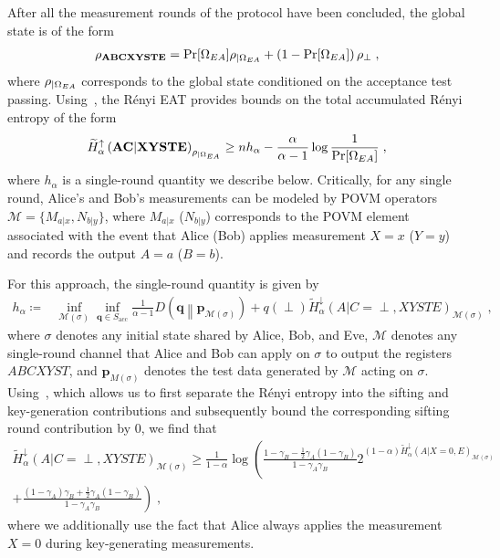 \documentclass[aps,reprint,showpacs,superscriptaddress]{revtex4-2}
\newcommand{\vect}[1]{\mathbf{#1}}
\begin{document}
After all the measurement rounds of the protocol have been concluded, the global state is of the form
\begin{align}
\rho_{\mathbf{A}\mathbf{B}\mathbf{C}\mathbf{X}\mathbf{Y}\mathbf{S}\mathbf{T}\mathbf{E}} = \Pr[\Omega_{EA}]\rho_{|\Omega_{EA}} + \left(1-\Pr[\Omega_{EA}] \right) \rho_{\perp} \; ,
\end{align}
where $\rho_{|\Omega_{EA}}$ corresponds to the global state
conditioned on the acceptance test passing.
Using~\cite[Lemma $5.1$]{arq2024generalized}, the R\'{e}nyi EAT provides bounds on the total accumulated R\'{e}nyi entropy of the form
\begin{align}
\widetilde{H}_{\alpha}^{\uparrow}\left(\mathbf{A}\mathbf{C}|
\mathbf{X}\mathbf{Y}\mathbf{S}\mathbf{T}\mathbf{E}\right)_{\rho_{|\Omega_{EA}}} \geq n h_{\alpha}
- \frac{\alpha}{\alpha-1} \log\frac{1}{\Pr[\Omega_{EA}]} \; ,
\end{align}
where $h_{\alpha} $ is a single-round quantity we describe below.
Critically, for any single round, Alice's and Bob's measurements can be modeled by POVM operators $\mathcal{M}=\{M_{a|x},N_{b|y} \}$, where $M_{a|x}$ ($N_{b|y}$) corresponds to the POVM element associated with the event that Alice (Bob) applies measurement $X=x$ ($Y=y$) and records the output $A=a$ ($B=b$).

For this approach, the single-round quantity is given by
\begin{align} \label{eq: halphaREAT}
h_{\alpha} \coloneqq& \inf_{\mathcal{M}(\sigma)} \inf_{\vect{q} \in S_\mathrm{acc}}   \frac{1}{\alpha-1}D\left(
\vect{q} \middle\Vert \vect{p}_{\mathcal{M}(\sigma)}
\right) + q(\perp)\widetilde{H}_{\alpha}^{\downarrow}\left( A|C=\perp,XYSTE\right)_{\mathcal{M}(\sigma)} \; ,
\end{align}
where $\sigma$ denotes any initial state shared by Alice, Bob, and Eve, $\mathcal{M}$ denotes any single-round channel that Alice and Bob can apply on $\sigma$ to output the registers $ABCXYST$, and $\vect{p}_{M(\sigma)}$ denotes the test data generated by $\mathcal{M}$ acting on $\sigma$.
Using~\cite[Proposition $5.1$]{tomamichel2013framework}, which allows us to first separate the R\'{e}nyi entropy into the sifting and key-generation contributions and subsequently bound the corresponding sifting round contribution by $0$, we find that
\begin{multline}
\widetilde{H}_{\alpha}^{\downarrow}\left( A|C=\perp,XYSTE\right)_{\mathcal{M}(\sigma)} \geq \frac{1}{1-\alpha} \log \left( \frac{1- \gamma_{B} - \frac{1}{2}\gamma_{A}\left(1-\gamma_{B}\right) }{1-\gamma_{A}\gamma_{B}}2^{\left(1-\alpha\right)\widetilde{H}_{\alpha}^{\downarrow}\left( A|X=0, E\right)_{\mathcal{M}(\sigma)}} \right.\\
+ \left. \frac{\left(1-\gamma_{A}\right)\gamma_{B} + \frac{1}{2}\gamma_{A}\left(1-\gamma_{B}\right) }{1-\gamma_{A}\gamma_{B}}\right)\; ,
\end{multline}
where we additionally use the fact that Alice always applies the measurement $X=0$ during key-generating measurements.
\end{document}
